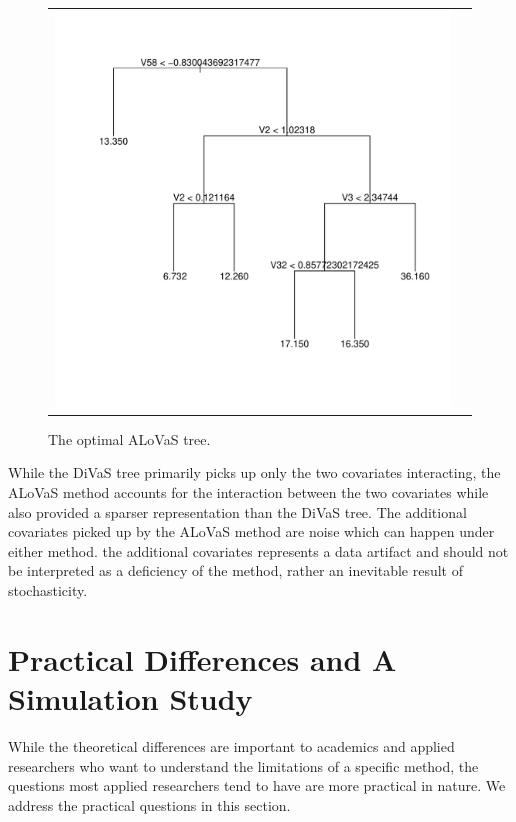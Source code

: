 \begin{figure}
\begin{center} 
\begin{tabular}{cc}
\includegraphics[scale=0.5]{figures/lasso_compare_tree.pdf}
\end{tabular}
\caption{The optimal ALoVaS tree.}
\label{fig:chain_max_interaction_tree}
\end{center}
\end{figure} 

While the DiVaS tree primarily picks up only the two covariates interacting, the ALoVaS method accounts for the interaction between the two covariates while also provided a sparser representation than the DiVaS tree. The additional covariates picked up by the ALoVaS method are noise which can happen under either method.  the additional covariates represents a data artifact and should not be interpreted as a deficiency of the method, rather an inevitable result of stochasticity. 
\section{Practical Differences and A Simulation Study}

While the theoretical differences are important to academics and applied researchers who want to understand the limitations of a specific method, the questions most applied researchers tend to have are more practical in nature. We address the practical questions in this section. 

